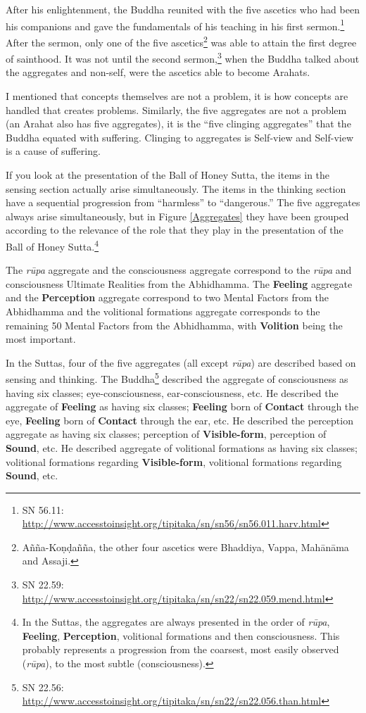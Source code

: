 After his enlightenment, the Buddha reunited with the five ascetics who had been his companions and gave the fundamentals of his teaching in his first sermon.\footnote{SN 56.11: \url{http://www.accesstoinsight.org/tipitaka/sn/sn56/sn56.011.harv.html}} After the sermon, only one of the five ascetics\footnote{Añña-Koṇḍañña, the other four ascetics were Bhaddiya, Vappa, Mahānāma and Assaji.} was able to attain the first degree of sainthood. It was not until the second sermon,\footnote{SN 22.59: \url{http://www.accesstoinsight.org/tipitaka/sn/sn22/sn22.059.mend.html}} when the Buddha talked about the aggregates and non-self, were the ascetics able to become Arahats.

I mentioned that concepts themselves are not a problem, it is how concepts are handled that creates problems. Similarly, the five aggregates are not a problem (an Arahat also has five aggregates), it is the “five clinging aggregates” that the Buddha equated with suffering. Clinging to aggregates is Self-view and Self-view is a cause of suffering.

If you look at the presentation of the Ball of Honey Sutta, the items in the sensing section actually arise simultaneously. The items in the thinking section have a sequential progression from “harmless” to “dangerous.” The five aggregates always arise simultaneously, but in Figure \ref{Aggregates} they have been grouped according to the relevance of the role that they play in the presentation of the Ball of Honey Sutta.\footnote{In the Suttas, the aggregates are always presented in the order of \textit{rūpa}, \textbf{Feeling}, \textbf{Perception}, volitional formations and then consciousness. This probably represents a progression from the coarsest, most easily observed (\textit{rūpa}), to the most subtle (consciousness).}

The \textit{rūpa} aggregate and the consciousness aggregate correspond to the \textit{rūpa} and consciousness Ultimate Realities from the Abhidhamma. The \textbf{Feeling} aggregate and the \textbf{Perception} aggregate correspond to two Mental Factors from the Abhidhamma and the volitional formations aggregate corresponds to the remaining 50 Mental Factors from the Abhidhamma, with \textbf{Volition} being the most important.

In the Suttas, four of the five aggregates (all except \textit{rūpa}) are described based on sensing and thinking. The Buddha\footnote{SN 22.56: \url{http://www.accesstoinsight.org/tipitaka/sn/sn22/sn22.056.than.html}} described the aggregate of consciousness as having six classes; eye-consciousness, ear-consciousness, etc. He described the aggregate of \textbf{Feeling} as having six classes; \textbf{Feeling} born of \textbf{Contact} through the eye, \textbf{Feeling} born of \textbf{Contact} through the ear, etc. He described the perception aggregate as having six classes; perception of \textbf{Visible-form}, perception of \textbf{Sound}, etc. He described aggregate of volitional formations as having six classes; volitional formations regarding \textbf{Visible-form}, volitional formations regarding \textbf{Sound}, etc.

